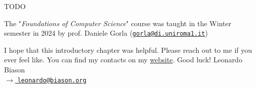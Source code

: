     \begin{thebibliography}{9}
         TODO
    \end{thebibliography}
\endgroup

\begin{tcolorbox}[colback=Dandelion!25, colframe=Dandelion!50]
    \begin{center}
        The "\textit{Foundations of Computer Science}" course was taught in the Winter semester in 2024 by prof. Daniele Gorla (\href{mailto:gorla@di.uniroma1.it}{\texttt{gorla@di.uniroma1.it}})
    \end{center}
\end{tcolorbox}

I hope that this introductory chapter was helpful. Please reach out to me if you ever feel like. You can find my contacts on my \href{https://www.leonardobiason.com}{website}. Good luck! \nl
Leonardo Biason\\
{\footnotesize \href{mailto:leonardo@biason.org}{$\to$ \texttt{leonardo@biason.org}}}